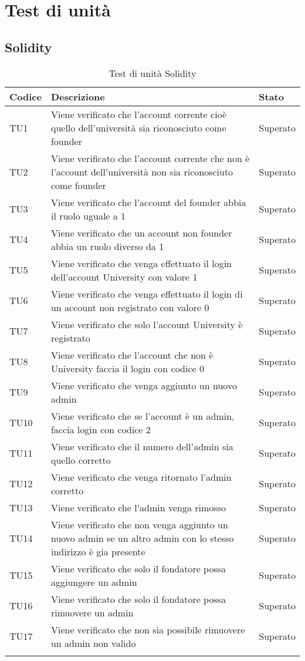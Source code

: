 \documentclass[PianoDiQualifica.tex]{subfiles}
\begin{document}
\chapter{Test di unità}
\section{Solidity}
\begin{longtable}[H]{P{2cm}P{8.5cm}P{3cm}}
	\color{CHeaderText}\textbf{Codice} & 
	\color{CHeaderText}\textbf{Descrizione} & 
	\color{CHeaderText}\textbf{Stato}\\
	\endhead
	TU1 & Viene verificato che l'account corrente cioè quello dell'università sia riconosciuto come founder & Superato \\ 
	TU2 & Viene verificato che l'account corrente che non è l'account dell'università non sia riconosciuto come founder & Superato \\
	TU3 & Viene verificato che l'account del founder abbia il ruolo uguale a 1 & Superato \\
	TU4 & Viene verificato che un account non founder abbia un ruolo diverso da 1 & Superato \\
	TU5 & Viene verificato che venga effettuato il login dell'account University con valore 1 & Superato \\
	TU6 & Viene verificato che venga effettuato il login di un account non registrato con valore 0 & Superato \\
	TU7 & Viene verificato che solo l'account University è registrato & Superato \\
	TU8 & Viene verificato che l'account che non è University faccia il login con codice 0 & Superato \\
	TU9 & Viene verificato che venga aggiunto un nuovo admin & Superato\\
	TU10 & Viene verificato che se l'account è un admin, faccia login con codice 2 & Superato \\
	TU11 & Viene verificato che il numero dell'admin sia quello corretto & Superato \\
	TU12 & Viene verificato che venga ritornato l'admin corretto & Superato \\
	TU13 & Viene verificato che l'admin venga rimosso & Superato \\
	TU14 & Viene verificato che non venga aggiunto un nuovo admin se un altro admin con lo stesso indirizzo è gia presente & Superato \\
	TU15 & Viene verificato che solo il fondatore possa aggiungere un admin  & Superato \\
	TU16 & Viene verificato che solo il fondatore possa rimuovere un admin & Superato \\
	TU17 & Viene verificato che non sia possibile rimuovere un admin non valido & Superato \\
	\hiderowcolors
	\caption{Test di unità Solidity}
\end{longtable}
\end{document}
